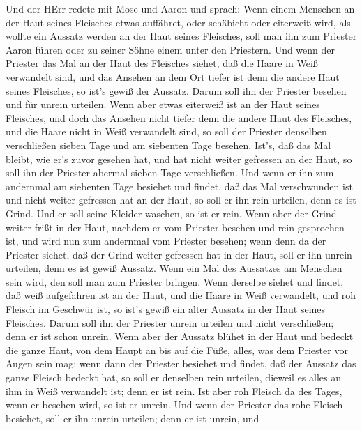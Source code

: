  Und der HErr redete mit Mose und Aaron und sprach:
 Wenn einem Menschen an der Haut seines Fleisches etwas
auffähret, oder schäbicht oder eiterweiß wird, als wollte ein Aussatz
werden an der Haut seines Fleisches, soll man ihn zum Priester Aaron
führen oder zu seiner Söhne einem unter den Priestern.  Und
wenn der Priester das Mal an der Haut des Fleisches siehet, daß die
Haare in Weiß verwandelt sind, und das Ansehen an dem Ort tiefer ist
denn die andere Haut seines Fleisches, so ist's gewiß der Aussatz. Darum
soll ihn der Priester besehen und für unrein urteilen.  Wenn
aber etwas eiterweiß ist an der Haut seines Fleisches, und doch das
Ansehen nicht tiefer denn die andere Haut des Fleisches, und die Haare
nicht in Weiß verwandelt sind, so soll der Priester denselben
verschließen sieben Tage  und am siebenten Tage besehen.
Ist's, daß das Mal bleibt, wie er's zuvor gesehen hat, und hat nicht
weiter gefressen an der Haut,  so soll ihn der Priester
abermal sieben Tage verschließen. Und wenn er ihn zum andernmal am
siebenten Tage besiehet und findet, daß das Mal verschwunden ist und
nicht weiter gefressen hat an der Haut, so soll er ihn rein urteilen,
denn es ist Grind. Und er soll seine Kleider waschen, so ist er rein.
 Wenn aber der Grind weiter frißt in der Haut, nachdem er
vom Priester besehen und rein gesprochen ist, und wird nun zum andernmal
vom Priester besehen;  wenn denn da der Priester siehet, daß
der Grind weiter gefressen hat in der Haut, soll er ihn unrein urteilen,
denn es ist gewiß Aussatz.  Wenn ein Mal des Aussatzes am
Menschen sein wird, den soll man zum Priester bringen. 
Wenn derselbe siehet und findet, daß weiß aufgefahren ist an der Haut,
und die Haare in Weiß verwandelt, und roh Fleisch im Geschwür ist,
 so ist's gewiß ein alter Aussatz in der Haut seines
Fleisches. Darum soll ihn der Priester unrein urteilen und nicht
verschließen; denn er ist schon unrein.  Wenn aber der
Aussatz blühet in der Haut und bedeckt die ganze Haut, von dem Haupt an
bis auf die Füße, alles, was dem Priester vor Augen sein mag;
 wenn dann der Priester besiehet und findet, daß der
Aussatz das ganze Fleisch bedeckt hat, so soll er denselben rein
urteilen, dieweil es alles an ihm in Weiß verwandelt ist; denn er ist
rein.  Ist aber roh Fleisch da des Tages, wenn er besehen
wird, so ist er unrein.  Und wenn der Priester das rohe
Fleisch besiehet, soll er ihn unrein urteilen; denn er ist unrein, und
